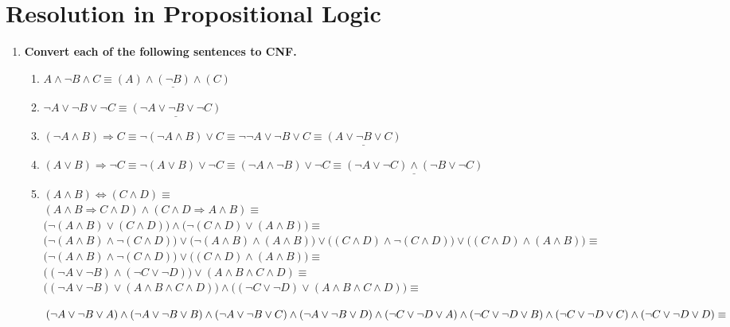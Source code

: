 \section{Resolution in Propositional Logic}

\begin{enumerate}

\item \textbf{Convert each of the following sentences to \acf{CNF}.}

\begin{enumerate}

\item $A \land \neg B \land C \equiv \underline{(A) \land (\neg B) \land (C)}$

\item $\neg A \lor \neg B \lor \neg C \equiv \underline{(\neg A \lor \neg B \lor \neg C)}$

\item
$(\neg A \land B) \Rightarrow C \equiv
\neg (\neg A \land B) \lor C \equiv
\neg \neg A \lor \neg B \lor C \equiv
\underline{(A \lor \neg B \lor C)}$

\item
$(A \lor B) \Rightarrow \neg C \equiv
\neg (A \lor B) \lor \neg C \equiv
(\neg A \land \neg B) \lor \neg C \equiv
\underline{(\neg A \lor \neg C) \land (\neg B \lor \neg C)}$

\item
$(A \land B) \Leftrightarrow (C \land D) \equiv$\\
$(A \land B \Rightarrow C \land D) \land (C \land D \Rightarrow A \land B) \equiv$\\
$\big(\neg (A \land B) \lor (C \land D)\big) \land \big(\neg (C \land D) \lor (A \land B)\big) \equiv$\\
$\big(\neg (A \land B) \land \neg (C \land D)\big) \lor \big(\neg (A \land B) \land (A \land B)\big) \lor \big((C \land D) \land \neg (C \land D)\big) \lor \big((C \land D) \land (A \land B)\big) \equiv$\\
$\big(\neg (A \land B) \land \neg (C \land D)\big) \lor \big((C \land D) \land (A \land B)\big) \equiv$\\
$\big((\neg A \lor \neg B) \land (\neg C \lor \neg D)\big) \lor (A \land B \land C \land D) \equiv$\\
$\big((\neg A \lor \neg B) \lor (A \land B \land C \land D)\big) \land \big((\neg C \lor \neg D) \lor (A \land B \land C \land D)\big) \equiv $ 

$(\neg A \lor \neg B \lor A) \land (\neg A \lor \neg B \lor B) \land (\neg A \lor \neg B \lor C) \land (\neg A \lor \neg B \lor D) \land\\(\neg C \lor \neg D \lor A) \land (\neg C \lor \neg D \lor B) \land (\neg C \lor \neg D \lor C) \land (\neg C \lor \neg D \lor D) \equiv $ 


\end{enumerate}
\end{enumerate}
